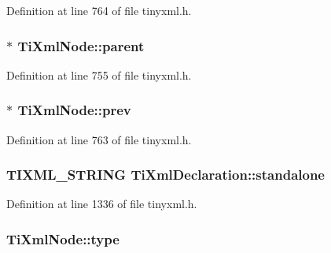 Definition at line 764 of file tinyxml.h.

\hypertarget{classTiXmlNode_a662c4de61244e4fa5bd4e2d8c63143a5}{
\subsubsection[{parent}]{$\ast$ {\bf TiXmlNode::parent}}}
\label{d3/dd5/classTiXmlNode_a662c4de61244e4fa5bd4e2d8c63143a5}


Definition at line 755 of file tinyxml.h.

\hypertarget{classTiXmlNode_a9c5370ea2cbfd9f0e0f7b30a57fd68f5}{
\subsubsection[{prev}]{$\ast$ {\bf TiXmlNode::prev}}}
\label{d3/dd5/classTiXmlNode_a9c5370ea2cbfd9f0e0f7b30a57fd68f5}


Definition at line 763 of file tinyxml.h.

\hypertarget{classTiXmlDeclaration_a52524bf1a0726104350fe4121d7fdff4}{
\subsubsection[{standalone}]{\setlength{\rightskip}{0pt plus 5cm}TIXML\_\-STRING {\bf TiXmlDeclaration::standalone}}}
\label{d2/df2/classTiXmlDeclaration_a52524bf1a0726104350fe4121d7fdff4}


Definition at line 1336 of file tinyxml.h.

\hypertarget{classTiXmlNode_a2619c6379181c16ba95ae6922e2ca839}{
\subsubsection[{type}]{ {\bf TiXmlNode::type}}}
\label{d3/dd5/classTiXmlNode_a2619c6379181c16ba95ae6922e2ca839}


